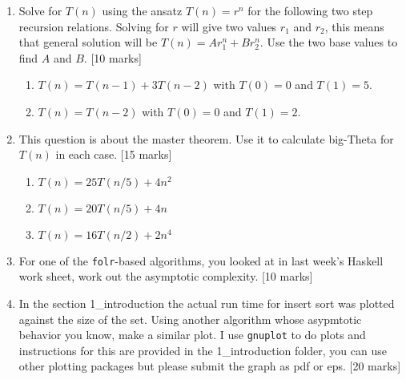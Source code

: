 \documentclass[11pt,a4paper]{scrartcl}
\begin{document}
\begin{enumerate}
\begin{enumerate}
\end{enumerate}

\item Solve for $T(n)$ using the ansatz $T(n)=r^n$ for the following
  two step recursion relations. Solving for $r$ will give two values
  $r_1$ and $r_2$, this means that general solution will be
  $T(n)=Ar_1^n+Br_2^n$. Use the two base values to find $A$ and $B$.  [10 marks]

\begin{enumerate}
\item $T(n)=T(n-1)+3T(n-2)$ with $T(0)=0$ and $T(1)=5$.
\item $T(n)=T(n-2)$ with $T(0)=0$ and $T(1)=2$.
\end{enumerate}

\item This question is about the master theorem. Use it to
  calculate big-Theta for $T(n)$ in each case.  [15 marks] 

\begin{enumerate}
\item $T(n)= 25T(n/5)+4n^2$
\item $T(n)= 20T(n/5)+4n$
\item $T(n)= 16T(n/2)+2n^4$
\end{enumerate}

\item For one of the \texttt{folr}-based algorithms, you looked at
  in last week's Haskell work sheet, work out the asymptotic
  complexity.  [10 marks]

\item In the section 1\_introduction the actual run time
  for insert sort was plotted against the size of the set. Using
  another algorithm whose asypmtotic behavior you know, make a similar
  plot. I use \texttt{gnuplot} to do plots and instructions for this
  are provided in the 1\_introduction folder, you can use other
  plotting packages but please submit the graph as pdf or eps.  [20 marks]

\end{enumerate}
\end{document}
